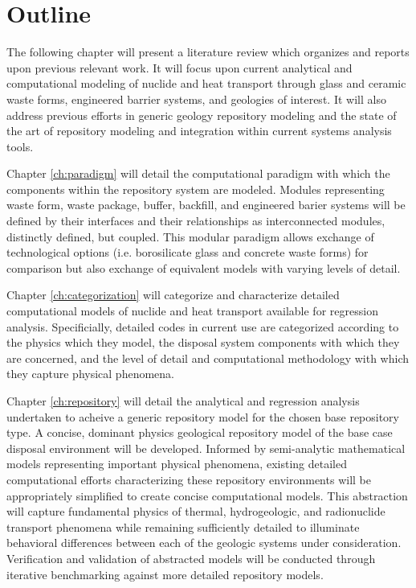 \section{Outline}

The following chapter will present a literature review which organizes 
and reports upon previous relevant work. It will focus upon current 
analytical and computational modeling of nuclide and heat transport 
through glass and ceramic waste forms, engineered barrier systems, and 
geologies of interest. It will also address previous efforts in 
generic geology repository modeling and the state of the art of 
repository modeling and integration within current systems analysis 
tools. 

Chapter \ref{ch:paradigm} will detail the computational paradigm with 
which the components within the repository system are modeled. Modules 
representing waste form, waste package, buffer, backfill, and 
engineered barier systems will be defined by their interfaces and 
their relationships as interconnected modules, distinctly defined, but 
coupled. This modular paradigm allows exchange  of technological 
options (i.e. borosilicate glass and concrete waste forms) for 
comparison but also exchange of equivalent models with varying levels 
of detail.

Chapter \ref{ch:categorization} will categorize and characterize 
detailed computational models of nuclide and heat transport available 
for regression analysis. Specificially, detailed codes in current use 
are categorized according to the physics which they model, the 
disposal system components with which they are concerned, and the 
level of detail and computational methodology with which they capture 
physical phenomena. 

%
Chapter \ref{ch:repository} will detail the analytical and regression 
analysis undertaken to acheive a generic repository model for the 
chosen base repository type. A concise, dominant physics geological 
repository model of the base case disposal environment will be 
developed. Informed by semi-analytic mathematical models representing 
important physical phenomena, existing detailed computational efforts 
characterizing these repository environments will be appropriately 
simplified to create concise computational models. This abstraction 
will capture fundamental physics of thermal, hydrogeologic, and 
radionuclide transport phenomena while remaining sufficiently detailed 
to illuminate behavioral differences between each of the geologic 
systems under consideration.  Verification and validation of 
abstracted models will be conducted through iterative benchmarking 
against more detailed repository models.

